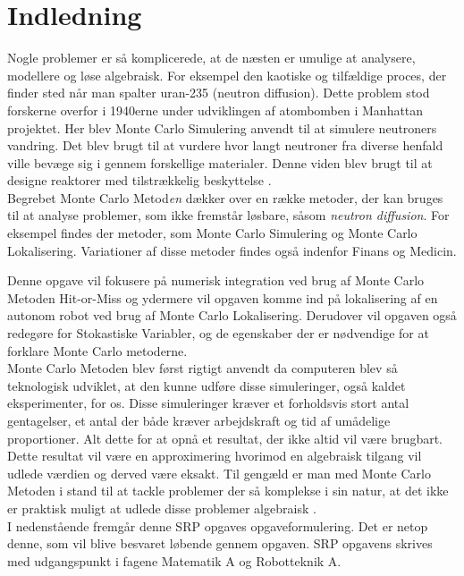 \documentclass[../../SRP.tex]{subfiles}
\begin{document}
\chapter{Indledning}

Nogle problemer er så komplicerede, at de næsten er umulige at analysere, modellere og løse algebraisk. For eksempel den kaotiske og tilfældige proces, der finder sted når man spalter uran-235 (neutron diffusion). Dette problem stod forskerne overfor i 1940erne under udviklingen af atombomben i Manhattan projektet. Her blev Monte Carlo Simulering anvendt til at simulere neutroners vandring. Det blev brugt til at vurdere hvor langt neutroner fra diverse henfald ville bevæge sig i gennem forskellige materialer. Denne viden blev brugt til at designe reaktorer med tilstrækkelig beskyttelse \cite{AHF}. \\

Begrebet Monte Carlo Metod\textit{en} dækker over en række metoder, der kan bruges til at analyse problemer, som ikke fremstår løsbare, såsom \textit{neutron diffusion}. For eksempel findes der metoder, som Monte Carlo Simulering og Monte Carlo Lokalisering. Variationer af disse metoder findes også indenfor Finans og Medicin. 

Denne opgave vil fokusere på numerisk integration ved brug af Monte Carlo Metoden Hit-or-Miss og ydermere vil opgaven komme ind på lokalisering af en autonom robot ved brug af Monte Carlo Lokalisering. Derudover vil opgaven også redegøre for Stokastiske Variabler, og de egenskaber der er nødvendige for at forklare Monte Carlo metoderne. \\

Monte Carlo Metoden blev først rigtigt anvendt da computeren blev så teknologisk udviklet, at den kunne udføre disse simuleringer, også kaldet eksperimenter, for os. Disse simuleringer kræver et forholdsvis stort antal gentagelser, et antal der både kræver arbejdskraft og tid af umådelige proportioner. Alt dette for at opnå et resultat, der ikke altid vil være brugbart. Dette resultat vil være en approximering hvorimod en algebraisk tilgang vil udlede værdien og derved være eksakt. Til gengæld er man med Monte Carlo Metoden i stand til at tackle problemer der så komplekse i sin natur, at det ikke er praktisk muligt at udlede disse problemer algebraisk \cite{SBM}. \\

I nedenstående fremgår denne SRP opgaves opgaveformulering. Det er netop denne, som vil blive besvaret løbende gennem opgaven. SRP opgavens skrives med udgangspunkt i fagene Matematik A og Robotteknik A. \\
\end{document}
